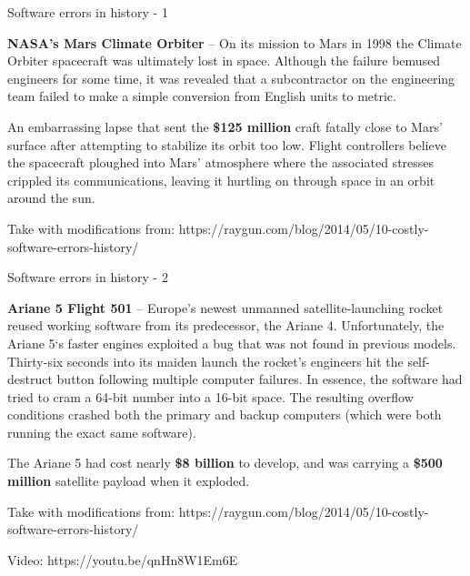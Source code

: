 \documentclass{beamer}
\begin{document}
\begin{frame}{\centerline{Software errors in history - 1}}


\textbf{NASA’s Mars Climate Orbiter} -- On its mission to Mars in 1998 the Climate Orbiter spacecraft was ultimately lost in space. Although the failure bemused engineers for some time, it was revealed that a subcontractor on the engineering team failed to make a simple conversion from English units to metric. 

An embarrassing lapse that sent the \textbf{\$125 million} craft fatally close to Mars' surface after attempting to stabilize its orbit too low. Flight controllers believe the spacecraft ploughed into Mars' atmosphere where the associated stresses crippled its communications, leaving it hurtling on through space in an orbit around the sun.
\newline 

Take with modifications from:
https://raygun.com/blog/2014/05/10-costly-software-errors-history/
\end{frame}

\begin{frame}{\centerline{Software errors in history - 2}}
\small
\textbf{Ariane 5 Flight 501} -- Europe’s newest unmanned satellite-launching rocket reused working software from its predecessor, the Ariane 4. Unfortunately, the Ariane 5`s faster engines exploited a bug that was not found in previous models. Thirty-six seconds into its maiden launch the rocket’s engineers hit the self-destruct button following multiple computer failures. In essence, the software had tried to cram a 64-bit number into a 16-bit space. The resulting overflow conditions crashed both the primary and backup computers (which were both running the exact same software). 

The Ariane 5 had cost nearly \textbf{\$8 billion} to develop, and was carrying a \textbf{\$500 million} satellite payload when it exploded. 
\newline 

Take with modifications from: https://raygun.com/blog/2014/05/10-costly-software-errors-history/

Video:  https://youtu.be/qnHn8W1Em6E
\end{frame}
\end{document}
